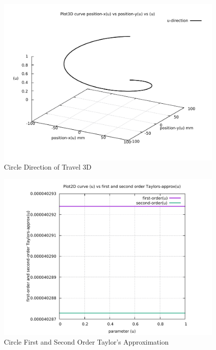 \begin{figure}
	\caption     {Circle Direction of Travel 3D}
	\label{04-img-Circle Direction of Travel 3D.pdf}
	\includegraphics[width=1.00\textwidth]{Chap4/appendix/app-Circle/plots/04-img-Circle Direction of Travel 3D.pdf}
\end{figure}

\clearpage
\pagebreak

\begin{figure}
	\caption     {Circle First and Second Order Taylor's Approximation}
	\label{05-img-Circle-First-and-Second-Order-Taylors-Approx.pdf}
	\includegraphics[width=1.00\textwidth]{Chap4/appendix/app-Circle/plots/05-img-Circle-First-and-Second-Order-Taylors-Approx.pdf}
\end{figure}


